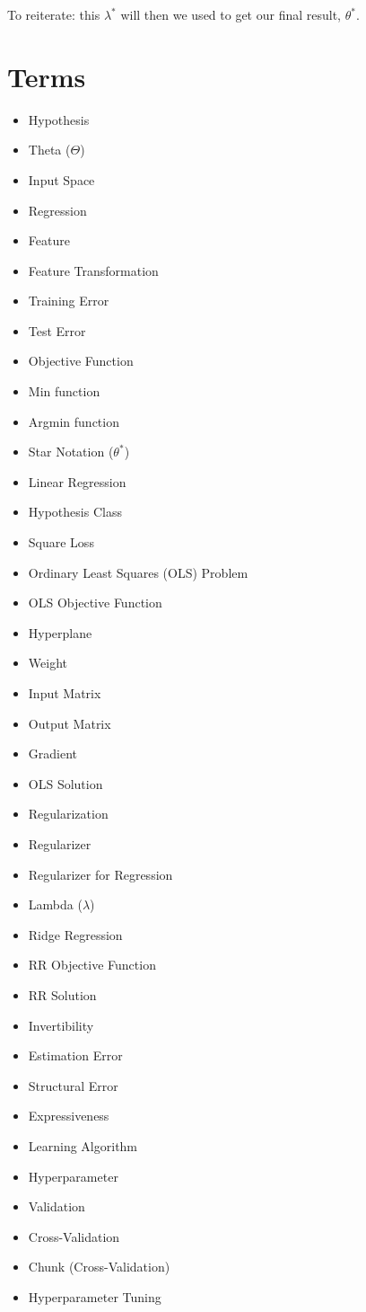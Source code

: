     To reiterate: this $\lambda^*$ will then we used to get our final result, $\theta^*$.

\pagebreak
        
\section{Terms}

    \begin{itemize}
        \item Hypothesis
        \item Theta ($\Theta$)
        \item Input Space
        \item Regression
        \item Feature
        \item Feature Transformation
        \item Training Error
        \item Test Error
        \item Objective Function
        \item Min function
        \item Argmin function
        \item Star Notation ($\theta^*$)
        \item Linear Regression
        \item Hypothesis Class
        \item Square Loss
        \item Ordinary Least Squares (OLS) Problem
        \item OLS Objective Function
        \item Hyperplane
        \item Weight
        \item Input Matrix
        \item Output Matrix
        \item Gradient
        \item OLS Solution
        \item Regularization
        \item Regularizer
        \item Regularizer for Regression
        \item Lambda ($\lambda$)
        \item Ridge Regression
        \item RR Objective Function
        \item RR Solution
        \item Invertibility
        \item Estimation Error
        \item Structural Error
        \item Expressiveness
        \item Learning Algorithm
        \item Hyperparameter
        \item Validation
        \item Cross-Validation
        \item Chunk (Cross-Validation)
        \item Hyperparameter Tuning
    \end{itemize}
        
        
        






